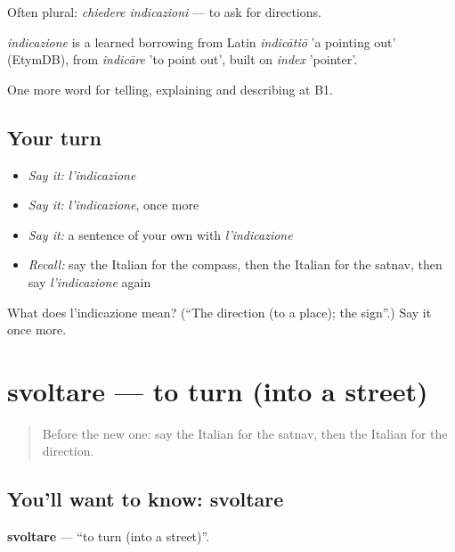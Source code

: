 Often plural: \emph{chiedere indicazioni} — to ask for directions.

\begin{cousinweb}
\emph{indicazione} is a learned borrowing from Latin \emph{indicātiō} 'a pointing out' (EtymDB), from \emph{indicāre} 'to point out', built on \emph{index} 'pointer'.
\end{cousinweb}

\begin{grammarlens}[title={What you've built}]
One more word for telling, explaining and describing at B1.
\end{grammarlens}

\subsection*{Your turn}
\begin{itemize}
\raggedright
  \item \emph{Say it:} \emph{l'indicazione}
  \item \emph{Say it:} \emph{l'indicazione}, once more
  \item \emph{Say it:} a sentence of your own with \emph{l'indicazione}
  \item \emph{Recall:} say the Italian for the compass, then the Italian for the satnav, then say \emph{l'indicazione} again
\end{itemize}

\begin{tcolorbox}[breakable,colback=teal!4,colframe=teal!35!black,title={Before you move on}]
What does l'indicazione mean? (\textquotedblleft{}The direction (to a place); the sign\textquotedblright{}.) Say it once more.
\end{tcolorbox}
\section[svoltare]{svoltare — to turn (into a street)}

\label{lesson:IT-C440-svoltare}



\begin{quote}
Before the new one: say the Italian for the satnav, then the Italian for the direction.
\end{quote}

\subsection*{You'll want to know: svoltare}
\textbf{svoltare} — \textquotedblleft{}to turn (into a street)\textquotedblright{}.

